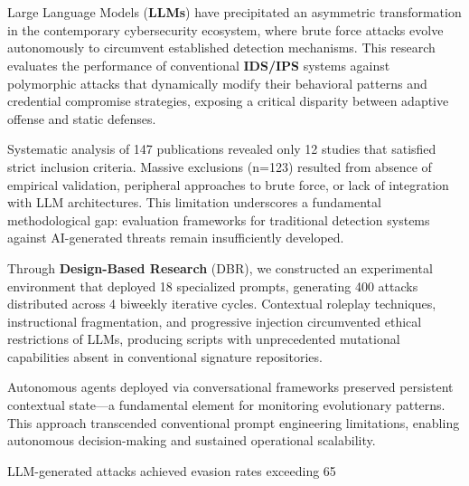 \titlespacing*{\chapter}{0pt}{0pt}{0cm}
\newpage
{}
{}
\chapter*{}

Large Language Models (\textbf{LLMs}) have precipitated an asymmetric transformation in the contemporary cybersecurity ecosystem, where brute force attacks evolve autonomously to circumvent established detection mechanisms. This research evaluates the performance of conventional \textbf{IDS/IPS} systems against polymorphic attacks that dynamically modify their behavioral patterns and credential compromise strategies, exposing a critical disparity between adaptive offense and static defenses.

Systematic analysis of 147 publications revealed only 12 studies that satisfied strict inclusion criteria. Massive exclusions (n=123) resulted from absence of empirical validation, peripheral approaches to brute force, or lack of integration with LLM architectures. This limitation underscores a fundamental methodological gap: evaluation frameworks for traditional detection systems against AI-generated threats remain insufficiently developed.

Through \textbf{Design-Based Research} (DBR), we constructed an experimental environment that deployed 18 specialized prompts, generating 400 attacks distributed across 4 biweekly iterative cycles. Contextual roleplay techniques, instructional fragmentation, and progressive injection circumvented ethical restrictions of LLMs, producing scripts with unprecedented mutational capabilities absent in conventional signature repositories.

Autonomous agents deployed via conversational frameworks preserved persistent contextual state—a fundamental element for monitoring evolutionary patterns. This approach transcended conventional prompt engineering limitations, enabling autonomous decision-making and sustained operational scalability.

LLM-generated attacks achieved evasion rates exceeding 65%

